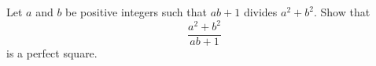 Let $ a$ and $ b$ be positive integers such that $ ab + 1$ divides $ a^{2} + b^{2}$. Show that \[ \frac{a^{2} + b^{2}}{ab + 1} \] is a perfect square.

